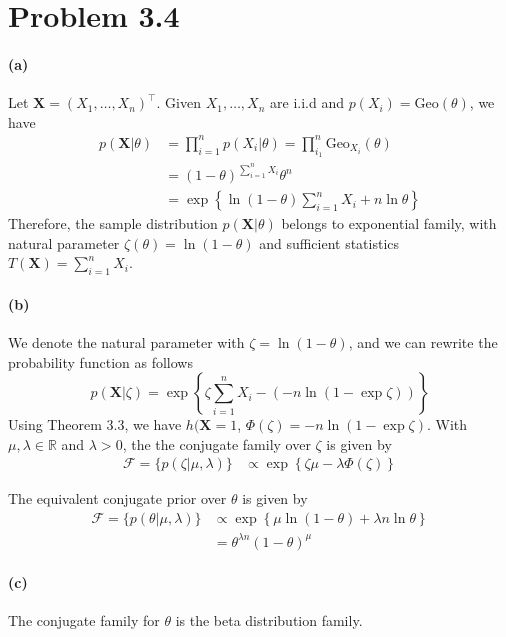 \section{Problem 3.4}
\paragraph{(a)}
Let $\bm{X} = (X_1, \dots, X_n)^\top$. Given $X_1, \dots, X_n$ are i.i.d and $p(X_i) = \mathrm{Geo}(\theta)$, we have
\begin{align*}
    p(\bm{X} \vert \theta) 
    &= \prod_{i=1}^{n} p(X_i \vert \theta) = \prod_{i_1}^{n} \mathrm{Geo}_{X_i}(\theta)\\
    &= (1-\theta)^{\sum_{i=1}^{n} X_i} \theta^n\\
    &= \exp \left\{ \ln (1-\theta) \sum_{i=1}^{n}X_i +n\ln \theta \right\}
\end{align*}
Therefore, the sample distribution $p(\bm{X} \vert \theta)$ belongs to exponential family, with natural parameter $\zeta(\theta) = \ln(1-\theta)$ and sufficient statistics $T(\bm{X}) = \sum_{i=1}^{n}X_i$.

\paragraph{(b)}
We denote the natural parameter with $\zeta = \ln (1-\theta)$, and we can rewrite the probability function as follows
\begin{equation*}
    p(\bm{X} \vert \zeta)
    = \exp \left \{\zeta \sum_{i=1}^{n} X_i - \left( -n\ln (1 - \exp \zeta) \right) \right\}
\end{equation*}
Using Theorem 3.3, we have $h(\bm{X} = 1$, $\Phi(\zeta) = -n\ln (1 - \exp \zeta)$. With $\mu, \lambda \in \mathbb{R}$ and $\lambda > 0$, the the conjugate family over $\zeta$ is given by
\begin{align*}
    \mathcal{F} = \{ p(\zeta \vert \mu, \lambda) \}
    &\propto \exp \left\{ \zeta\mu - \lambda \Phi(\zeta) \right\}
\end{align*}

The equivalent conjugate prior over $\theta$ is given by 
\begin{align*}
    \mathcal{F} = \{ p(\theta \vert \mu, \lambda) \}
    &\propto \exp \left\{\mu \ln (1-\theta) + \lambda n \ln \theta
        \right\}\\
    &= \theta ^ {\lambda n} (1-\theta)^\mu 
\end{align*}

\paragraph{(c)}
The conjugate family for $\theta$ is the beta distribution family.

